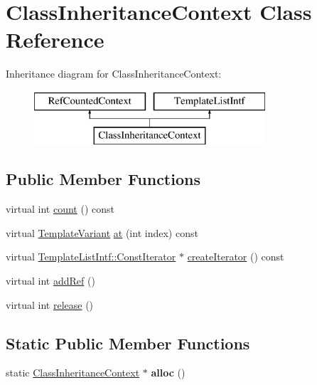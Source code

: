 \hypertarget{class_class_inheritance_context}{}\section{Class\+Inheritance\+Context Class Reference}
\label{class_class_inheritance_context}
Inheritance diagram for Class\+Inheritance\+Context\+:\begin{figure}[H]
\begin{center}
\leavevmode
\includegraphics[height=2.000000cm]{class_class_inheritance_context}
\end{center}
\end{figure}
\subsection*{Public Member Functions}
\begin{DoxyCompactItemize}
\item 
virtual int \mbox{\hyperlink{class_class_inheritance_context_a8fa0bcb90c0640638cd4168e91696a16}{count}} () const
\item 
virtual \mbox{\hyperlink{class_template_variant}{Template\+Variant}} \mbox{\hyperlink{class_class_inheritance_context_ad824ec079b4dc94d2b5b3e6a0e60984a}{at}} (int index) const
\item 
virtual \mbox{\hyperlink{class_template_list_intf_1_1_const_iterator}{Template\+List\+Intf\+::\+Const\+Iterator}} $\ast$ \mbox{\hyperlink{class_class_inheritance_context_a7affeabd7e388c7049fc5ebf01916e3f}{create\+Iterator}} () const
\item 
virtual int \mbox{\hyperlink{class_class_inheritance_context_add3dd0b40d3bed1b4e48899991dbaf84}{add\+Ref}} ()
\item 
virtual int \mbox{\hyperlink{class_class_inheritance_context_a4570bbdc5944d0c453971ec822106f9e}{release}} ()
\end{DoxyCompactItemize}
\subsection*{Static Public Member Functions}
\begin{DoxyCompactItemize}
\item 
\mbox{\label{class_class_inheritance_context_a5ca3bfb48ae56dfea7f6c39734059099}} 
static \mbox{\hyperlink{class_class_inheritance_context}{Class\+Inheritance\+Context}} $\ast$ {\bfseries alloc} ()
\end{DoxyCompactItemize}


